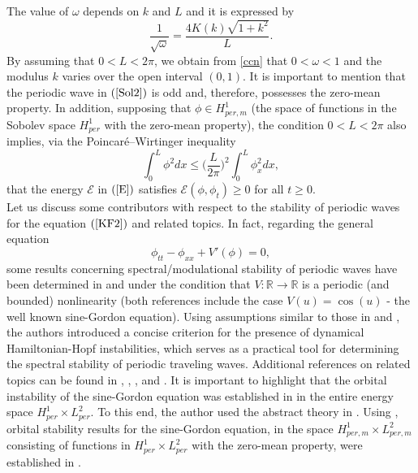 \documentclass[12pt,reqno,a4paper]{amsart} %
\numberwithin{equation}{section}
\numberwithin{figure}{section}
\begin{document}
The value of $\omega$ depends on $k$ and $L$ and it is expressed by    \begin{equation}\label{ccn}
	\frac{1}{\sqrt{\omega}}=\frac{4K(k)\sqrt{1+k^2}}{L}.\end{equation}
By assuming that $0<L<2\pi$, we obtain from \eqref{ccn} that $0<\omega<1$ and the modulus $k$ varies over the  open interval $\left(0,1\right)$. It is important to mention that the periodic wave in $(\ref{Sol2})$ is odd and, therefore, possesses the zero-mean property. In addition, supposing that $\phi \in H_{per,m}^1$ (the space of functions in the Sobolev space $H_{per}^1$ with the zero-mean property), the condition $0 < L < 2\pi$ also implies, via the Poincaré–Wirtinger inequality 
\begin{equation}\label{PW1}\int_0^L\phi^2dx\leq 	\biggl(\frac{L}{2\pi}\biggl)^2\int_0^L\phi_x^2dx,\end{equation} that the energy $\mathcal{E}$ in $(\ref{E})$ satisfies $\mathcal{E}(\phi, \phi_t) \geq 0$ for all  $t\geq0$.\\
\indent Let us discuss some contributors with respect to the stability of periodic waves for the equation $(\ref{KF2})$ and related topics. In fact, regarding the general equation
\begin{equation}\phi_{tt}-\phi_{xx}+V'(\phi)=0,\label{genKG}\end{equation}
some results concerning spectral/modulational stability of periodic waves have been determined in \cite{jones2} and \cite{jones1} under the condition that $V:\mathbb{R}\rightarrow \mathbb{R}$ is a  periodic (and bounded) nonlinearity (both references include the case $V(u)=\cos(u)$ - the well known sine-Gordon equation). Using assumptions similar to those in \cite{jones1} and \cite{MM}, the authors introduced a concise criterion for the presence of dynamical Hamiltonian-Hopf instabilities, which serves as a practical tool for determining the spectral stability of periodic traveling waves. Additional references on related topics can be found in \cite{pava}, \cite{clarke}, \cite{hakkaev1}, and \cite{stan}. It is important to highlight that the orbital instability of the sine-Gordon equation was established in \cite{Natali2011} in the entire energy space $H_{per}^1\times L_{per}^2$. To this end, the author used the abstract theory in \cite{grillakis1}. Using \cite{grillakis1}, orbital stability results for the sine-Gordon equation, in the space $H_{per,m}^1\times L_{per,m}^2$ consisting of functions in $H_{per}^1\times L_{per}^2$ with the zero-mean property, were established in \cite{nataliSG}. \\
\end{document}

